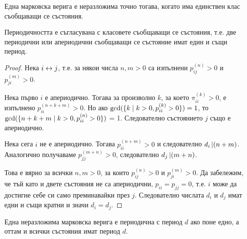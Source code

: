 \documentclass[numbers=endperiod, DIV=15, bibliography=totocnumbered]{scrartcl}
\begin{document}
\begin{corollary}
  Една марковска верига е неразложима точно тогава, когато има единствен клас съобщаващи се състояния.
\end{corollary}

\begin{proposition}
  Периодичността е съгласувана с класовете съобщаващи се състояния, т.е. две периодични или апериодични съобщаващи се състояние имат един и същи период.
\end{proposition}
\begin{proof}
  Нека $i \leftrightarrow j$, т.е. за някои числа $n, m > 0$ са изпълнени $p_{ij}^{(n)} > 0$ и $p_{ji}^{(m)} > 0$.

  Нека първо $i$ е апериодично. Тогава за произволно $k$, за което $\pi_{ii}^{(k)} > 0$, е изпълнено $p_{ii}^{(n+k+m)} > 0$. Но ако $\operatorname{gcd} (\{ k \mid k > 0, p_{ii}^{(k)} > 0 \}) = 1$, то $\operatorname{gcd} (\{ n+k+m \mid k > 0, p_{ii}^{(n)} > 0 \})$ = 1. Следователно състоянието $j$ също е апериодично.

  Нека сега $i$ не е апериодично. Тогава $p_{ii}^{(n+m)} > 0$ и следователно $d_i \operatorname{\vert} (n+m)$. Аналогично получаваме $p_{jj}^{(m+n)} > 0$, следователно $d_j \operatorname{\vert} (m+n)$.

  Това е вярно за всички $n, m > 0$, за които $p_{ij}^{(n)} > 0$ и $p_{ji}^{(m)} > 0$. Да забележим, че тъй като и двете състояния не са апериодични, $p_{ii} = p_{jj} = 0$, т.е. $i$ може да достигне себе си само преминавайки през $j$. Следователно числата $d_i$ и $d_j$ имат едни и същи кратни и значи $d_i = d_j$.
\end{proof}

\begin{corollary}
  Една неразложима марковска верига е периодична с период $d$ ако поне едно, а оттам и всички състояния имат период $d$.
\end{corollary}
\end{document}
